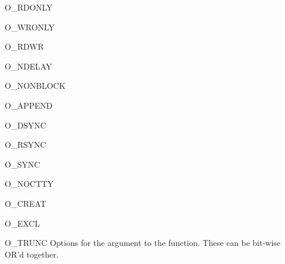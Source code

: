 \begin{datadesc}{O_RDONLY}
\end{datadesc}
\begin{datadesc}{O_WRONLY}
\end{datadesc}
\begin{datadesc}{O_RDWR}
\end{datadesc}
\begin{datadesc}{O_NDELAY}
\end{datadesc}
\begin{datadesc}{O_NONBLOCK}
\end{datadesc}
\begin{datadesc}{O_APPEND}
\end{datadesc}
\begin{datadesc}{O_DSYNC}
\end{datadesc}
\begin{datadesc}{O_RSYNC}
\end{datadesc}
\begin{datadesc}{O_SYNC}
\end{datadesc}
\begin{datadesc}{O_NOCTTY}
\end{datadesc}
\begin{datadesc}{O_CREAT}
\end{datadesc}
\begin{datadesc}{O_EXCL}
\end{datadesc}
\begin{datadesc}{O_TRUNC}
Options for the  argument to the  function.
These can be bit-wise OR'd together.
\end{datadesc}

